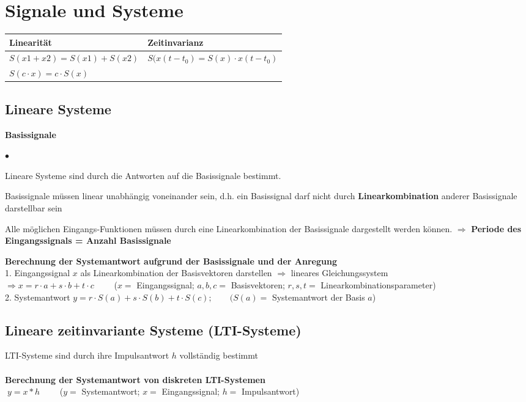 \section{Signale und Systeme}
  	\renewcommand{\arraystretch}{1.5}
	\begin{tabular}{|l|l|}
    	\hline
    	\textbf{Linearität} & \textbf{Zeitinvarianz}\\
    	\hline
    	$S(x1+x2)=S(x1)+S(x2)$ & $S(x(t-t_0)=S(x)\cdot x(t-t_0)$ \\
    	$S(c\cdot x)=c\cdot S(x)$ & \\
		\hline    
    \end{tabular}
  	\renewcommand{\arraystretch}{1}
  	
	\subsection{Lineare Systeme}
		\textbf{Basissignale}
		\begin{list}{$\bullet$}{\setlength{\itemsep}{0cm} \setlength{\parsep}{0cm} \setlength{\topsep}{0cm}} 
          \item Lineare Systeme sind durch die Antworten auf die
          Basissignale bestimmt.
          \item Basissignale müssen linear unabhängig voneinander sein, d.h. ein
		Basissignal darf nicht durch \textbf{Linearkombination} anderer Basissignale
		darstellbar sein          
		  \item Alle möglichen Eingangs-Funktionen müssen durch eine Linearkombination der
		Basissignale dargestellt werden können. $\Rightarrow$ \textbf{Periode des Eingangssignals =	Anzahl Basissignale}
        \end{list}
        \vspace{.2cm}
		\textbf{Berechnung der Systemantwort aufgrund der Basissignale und der
		Anregung}\\
		1. Eingangssignal $x$ als Linearkombination der Basisvektoren darstellen
		$\Rightarrow$ lineares Gleichungssystem\\
		$\Rightarrow x=r\cdot a + s\cdot b + t\cdot c\qquad$ ($x=$
		Eingangssignal; $a,b,c=$ Basisvektoren; $r,s,t=$
		Linearkombinationsparameter)\\ 
		2. Systemantwort $y=r\cdot S(a) + s\cdot S(b) + t\cdot S(c); \qquad (S(a)=$
		Systemantwort der Basis $a$)
	
	\subsection{Lineare zeitinvariante Systeme (LTI-Systeme)}
		LTI-Systeme sind durch ihre Impulsantwort $h$ vollständig bestimmt\\ \\
		\textbf{Berechnung der Systemantwort von diskreten LTI-Systemen}\\
		$\; y=x*h \qquad$ ($y=$ Systemantwort; $x=$ Eingangssignal; $h=$
		Impulsantwort)\\
		
